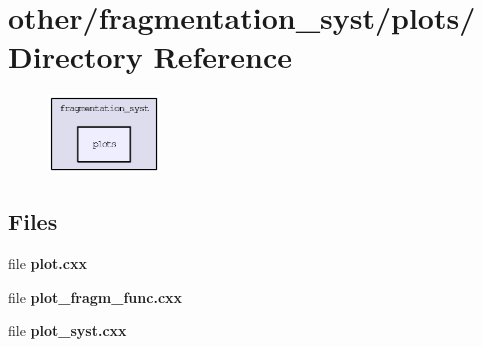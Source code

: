 \section{other/fragmentation\_\-syst/plots/ Directory Reference}
\label{dir_e91b02d2503757502633250727eea61d}


\begin{figure}[H]
\begin{center}
\leavevmode
\includegraphics[width=84pt]{dir_e91b02d2503757502633250727eea61d_dep}
\end{center}
\end{figure}
\subsection*{Files}
\begin{CompactItemize}
\item 
file \textbf{plot.cxx}
\item 
file \textbf{plot\_\-fragm\_\-func.cxx}
\item 
file \textbf{plot\_\-syst.cxx}
\end{CompactItemize}

